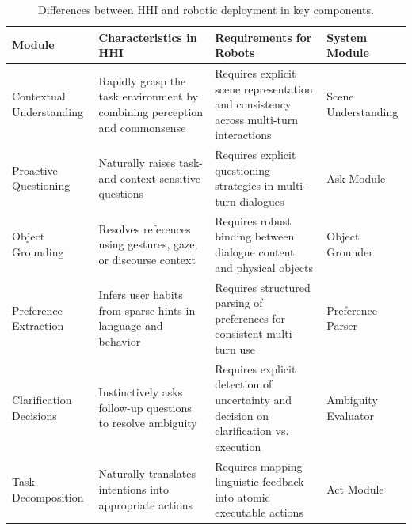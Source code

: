 \documentclass[sigconf,authordraft]{acmart}
\begin{document}
\begin{table}[t]
\centering
\caption{Differences between HHI and robotic deployment in key components.}
\label{tab:module_mapping}
\begin{tabularx}{\linewidth}{lX X l}
\hline
\textbf{Module} & \textbf{Characteristics in HHI} & \textbf{Requirements for Robots} & \textbf{System Module} \\
\hline
Contextual Understanding & Rapidly grasp the task environment by combining perception and commonsense & Requires explicit scene representation and consistency across multi-turn interactions & Scene Understanding \\
\hline
Proactive Questioning & Naturally raises task- and context-sensitive questions & Requires explicit questioning strategies in multi-turn dialogues & Ask Module \\
\hline
Object Grounding & Resolves references using gestures, gaze, or discourse context & Requires robust binding between dialogue content and physical objects & Object Grounder \\
\hline
Preference Extraction & Infers user habits from sparse hints in language and behavior & Requires structured parsing of preferences for consistent multi-turn use & Preference Parser \\
\hline
Clarification Decisions & Instinctively asks follow-up questions to resolve ambiguity & Requires explicit detection of uncertainty and decision on clarification vs. execution & Ambiguity Evaluator \\
\hline
Task Decomposition & Naturally translates intentions into appropriate actions & Requires mapping linguistic feedback into atomic executable actions & Act Module \\
\hline
\end{tabularx}
\end{table}
\end{document}
